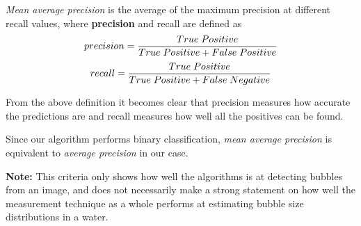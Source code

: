		  \textit{Mean average precision} is the average of the maximum precision at different recall values, where \textbf{precision} and recall are defined as
		  \begin{equation}
		  	precision = \dfrac{True \hspace{.1cm} Positive}{True \hspace{.1cm}  Positive + False \hspace{.1cm}  Positive}
		  \end{equation}
		  \begin{equation}
		  	recall = \dfrac{True \hspace{.1cm}  Positive}{True \hspace{.1cm}  Positive + False \hspace{.1cm}  Negative}
		  \end{equation}

		From the above definition it becomes clear that precision measures how accurate the predictions are and recall measures how well all the positives can be found.
		
		Since our algorithm performs binary classification, \textit{mean average precision} is equivalent to \textit{average precision} in our case. 
		
		\textbf{Note:} This criteria only shows how well the algorithms is at detecting bubbles from an image, and does not necessarily make a strong statement on how well the measurement technique as a whole performs at estimating bubble size distributions in a water. 
		
		 



































